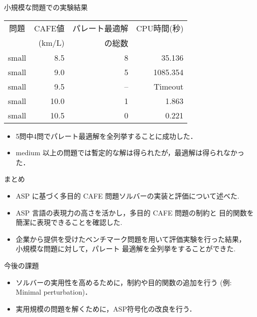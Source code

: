 \documentclass[dvipdfmx, 11pt]{beamer}
\begin{document}
\begin{frame}{小規模な問題での実験結果}
 \begin{exampleblock}{}
  \centering
  \begin{tabular}{c|r|rr}
   問題   & CAFE値  & パレート最適解 & CPU時間(秒) \\
          & (km/L)  & の総数  &  \\ \hline
   small  & 8.5   & 8             & 35.136     \\
   small  & 9.0   & 5             & 1085.354   \\
   small  & 9.5   & --            & Timeout    \\
   small  & 10.0  & 1             & 1.863      \\
   small  & 10.5  & 0             & 0.221      \\ 
  \end{tabular}
 \end{exampleblock}
 \begin{itemize}
  \item 5問中4問でパレート最適解を全列挙することに成功した．
  \item medium 以上の問題では暫定的な解は得られたが，最適解は得られなかった．
 \end{itemize}
\end{frame}
\begin{frame}{まとめ}
 \begin{itemize}
  \item ASP に基づく多目的 CAFE 問題ソルバーの実装と評価について述べた.   
  \item ASP 言語の表現力の高さを活かし，多目的 CAFE 問題の制約と
	目的関数を簡潔に表現できることを確認した.
  \item 企業から提供を受けたベンチマーク問題を用いて評価実験を行った結果，
	小規模な問題に対して，パレート 最適解を全列挙をすることができた.
 \end{itemize}
 \begin{block}{今後の課題}
  \begin{itemize}
   \item ソルバーの実用性を高めるために，制約や目的関数の追加を行う
	 (例: Minimal perturbation)．
   \item 実用規模の問題を解くために，ASP符号化の改良を行う．
  \end{itemize}
 \end{block}
\end{frame}
\end{document}
